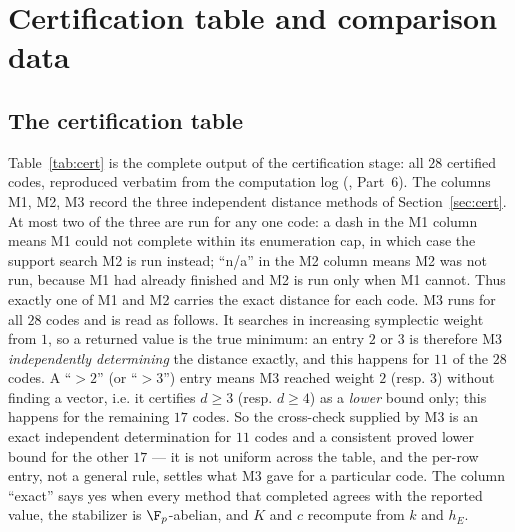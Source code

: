 \appendix
\section{Certification table and comparison data}
\label{app:tables}

\subsection{The certification table}

Table~\ref{tab:cert} is the complete output of the certification stage: all
$28$ certified codes, reproduced verbatim from the computation log
(, Part~6). The
columns M1, M2, M3 record the three independent distance methods of
Section~\ref{sec:cert}. At most two of the three are run for any one code:
a dash in the M1 column means M1 could not complete within its enumeration
cap, in which case the support search M2 is run instead; ``n/a'' in the M2
column means M2 was not run, because M1 had already finished and M2 is run
only when M1 cannot. Thus exactly one of M1 and M2 carries the exact distance
for each code. M3 runs for all $28$ codes and is read as follows. It searches
in increasing symplectic weight from $1$, so a returned value is the true
minimum: an entry $2$ or $3$ is therefore M3 \emph{independently determining}
the distance exactly, and this happens for $11$ of the $28$ codes. A ``$>2$''
(or ``$>3$'') entry means M3 reached weight $2$ (resp. $3$) without finding a
vector, i.e. it certifies $d\ge3$ (resp. $d\ge4$) as a \emph{lower} bound
only; this happens for the remaining $17$ codes. So the cross-check supplied by
M3 is an exact independent determination for $11$ codes and a consistent proved
lower bound for the other $17$ --- it is not uniform across the table, and the
per-row entry, not a general rule, settles what M3 gave for a particular code.
The column ``exact'' says yes when every method that completed agrees
with the reported value, the stabilizer is $\F_p$-abelian, and $K$ and $c$
recompute from $k$ and $h_E$.

